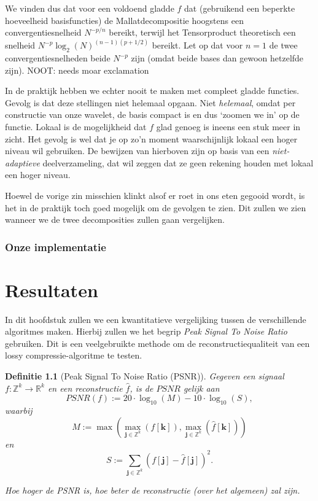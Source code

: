 \documentclass[11pt]{report}
\newcommand{\R}{\mathbb{R}}
\newcommand{\Z}{\mathbb{Z}}
\theoremstyle{plain}
\newtheorem*{definitie}{Definitie}
\theoremstyle{remark}
\begin{document}
We vinden dus dat voor een voldoend gladde $f$ dat (gebruikend een beperkte hoeveelheid basisfuncties) de Mallatdecompositie hoogstens een convergentiesnelheid $N^{-p/n}$ bereikt, terwijl het Tensorproduct theoretisch een snelheid $N^{-p} \log_2(N)^{(n-1)(p+1/2)}$ bereikt. Let op dat voor $n=1$ de twee convergentiesnelheden beide $N^{-p}$ zijn (omdat beide bases dan gewoon hetzelfde zijn).
NOOT: needs moar exclamation

In de praktijk hebben we echter nooit te maken met compleet gladde functies. Gevolg is dat deze stellingen niet helemaal opgaan. Niet \emph{helemaal}, omdat per constructie van onze wavelet, de basis compact is en dus `zoomen we in' op de functie. Lokaal is de mogelijkheid dat $f$ glad genoeg is ineens een stuk meer in zicht. Het gevolg is wel dat je op zo'n moment waarschijnlijk lokaal een hoger niveau wil gebruiken. De bewijzen van hierboven zijn op basis van een \emph{niet-adaptieve} deelverzameling, dat wil zeggen dat ze geen rekening houden met lokaal een hoger niveau.

Hoewel de vorige zin misschien klinkt alsof er roet in ons eten gegooid wordt, is het in de praktijk toch goed mogelijk om de gevolgen te zien. Dit zullen we zien wanneer we de twee decomposities zullen gaan vergelijken.

\subsection{Onze implementatie}

\chapter{Resultaten}
In dit hoofdstuk zullen we een kwantitatieve vergelijking tussen de verschillende algoritmes maken. Hierbij zullen we het begrip \emph{Peak Signal To Noise Ratio} gebruiken. Dit is een veelgebruikte methode om de reconstructiequaliteit van een lossy compressie-algoritme te testen.

\begin{definitie}[Peak Signal To Noise Ratio (PSNR)]
Gegeven een signaal $f: \Z^k \to \R^k$ en een reconstructie $\hat f$, is de $PSNR$ gelijk aan
\[
	PSNR(f) := 20 \cdot \log_{10}( M ) - 10 \cdot \log_{10}(S),
\]
waarbij
\[
	M := \max( \max_{\boldsymbol j \in \Z^k} (f[\boldsymbol k]), \max_{\boldsymbol j \in \Z^k} (\hat f[\boldsymbol k]))
\]
en
\[
	S := \sum_{\boldsymbol j \in \Z^k} (f[\boldsymbol j] - \hat f[\boldsymbol j])^2.
\]

Hoe hoger de PSNR is, hoe beter de reconstructie (over het algemeen) zal zijn.
\end{definitie}
\end{document}
